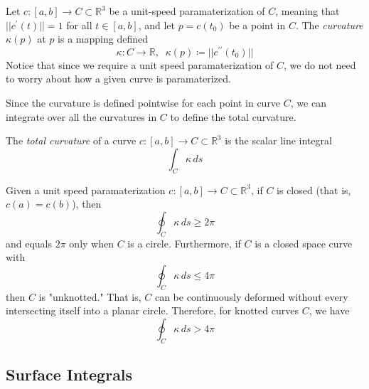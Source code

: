   \begin{definition}
		Let $c: [a, b] \to C \subset \mathbb{R}^3$ be a unit-speed paramaterization of $C$, meaning that $||c^\prime (t)|| = 1$ for all $t \in [a,b]$, and let $p = c(t_0)$ be a point in $C$. The \textit{curvature} $\kappa(p)$ at $p$ is a mapping defined
		\begin{equation}
			\kappa: C \to \mathbb{R}, \;\; \kappa(p) \coloneqq ||c^{\prime \prime} (t_0)||
		\end{equation}
		Notice that since we require a unit speed paramaterization of $C$, we do not need to worry about how a given curve is paramaterized. 
  \end{definition}
		
  Since the curvature is defined pointwise for each point in curve $C$, we can integrate over all the curvatures in $C$ to define the total curvature. 
		
  \begin{definition}
		The \textit{total curvature} of a curve $c: [a,b] \to C \subset \mathbb{R}^3$ is the scalar line integral 
		\begin{equation}
			\int_C \kappa \, ds
		\end{equation}
  \end{definition}
		
  \begin{theorem}
		Given a unit speed paramaterization $c: [a,b] \to C \subset \mathbb{R}^3$, if $C$ is closed (that is, $c(a)=c(b)$), then 
		\begin{equation}
			\oint_C \kappa\, ds \geq 2 \pi
		\end{equation}
		and equals $2\pi$ only when $C$ is a circle. Furthermore, if $C$ is a closed space curve with 
		\begin{equation}
			\oint_C \kappa\, ds \leq 4\pi
		\end{equation}
		then $C$ is "unknotted." That is, $C$ can be continuously deformed without every intersecting itself into a planar circle. Therefore, for knotted curves $C$, we have
		\begin{equation}
			\oint_C \kappa \, ds > 4\pi
		\end{equation}
  \end{theorem}
		
\subsection{Surface Integrals}
		
